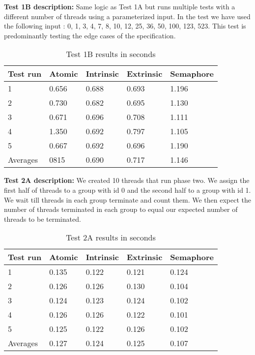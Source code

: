 \documentclass[11pt]{article}
\begin{document}
\textbf{Test 1B description:} Same logic as Test 1A but runs multiple tests with a different number of threads using a parameterized input. In the test we have used the following input : {0, 1, 3, 4, 7, 8, 10, 12, 25, 36, 50, 100, 123, 523}. This test is predominantly testing the edge cases of the specification. \\

\begin{table}[H]
\centering
\caption{Test 1B results in seconds}
\label{tab:my-table}
\begin{tabular}{|l|l|l|l|l|}
\hline
Test run & Atomic & Intrinsic & Extrinsic & Semaphore \\ \hline
1        & 0.656  & 0.688     & 0.693     & 1.196     \\ \hline
2        & 0.730  & 0.682     & 0.695     & 1.130     \\ \hline
3        & 0.671  & 0.696     & 0.708     & 1.111     \\ \hline
4        & 1.350  & 0.692     & 0.797     & 1.105     \\ \hline
5        & 0.667  & 0.692     & 0.696     & 1.190     \\ \hline
Averages & 0815   & 0.690     & 0.717     & 1.146     \\ \hline
\end{tabular}
\end{table}

\textbf{Test 2A description:} We created 10 threads that run phase two. We assign the first half of threads to a group with id 0 and the second half to a group with id 1. We wait till threads in each group terminate and count them. We then expect the number of threads terminated in each group to equal our expected number of threads to be terminated. \\


\begin{table}[H]
\centering
\caption{Test 2A results in seconds}
\label{tab:my-table}
\begin{tabular}{|l|l|l|l|l|}
\hline
Test run & Atomic & Intrinsic & Extrinsic & Semaphore \\ \hline
1        & 0.135  & 0.122     & 0.121     & 0.124     \\ \hline
2        & 0.126  & 0.126     & 0.130     & 0.104     \\ \hline
3        & 0.124  & 0.123     & 0.124     & 0.102     \\ \hline
4        & 0.126  & 0.126     & 0.122     & 0.101     \\ \hline
5        & 0.125  & 0.122     & 0.126     & 0.102     \\ \hline
Averages & 0.127  & 0.124     & 0.125     & 0.107     \\ \hline
\end{tabular}
\end{table}
\end{document}
